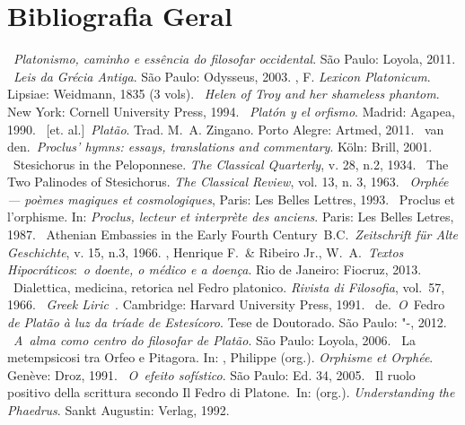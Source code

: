  

 

\section{Bibliografia Geral}


\begin{bibliohedra}
~\emph{Platonismo, caminho e essência do filosofar
  occidental}. São Paulo: Loyola, 2011.
~\emph{Leis da Grécia Antiga}. São Paulo: Odysseus,
  2003.
, F. \emph{Lexicon Platonicum}. Lipsiae: Weidmann,
  1835 (3 vols).
~\emph{Helen of Troy and her shameless phantom}. New York:
  Cornell University Press, 1994.
~\emph{Platón y el orfismo}. Madrid: Agapea, 1990.
~[et. al.]~\emph{Platão}. Trad. M.~A. Zingano. Porto
  Alegre: Artmed, 2011.
~van den.~\emph{Proclus' hymns: essays, translations and
  commentary}. Köln: Brill, 2001.
~Stesichorus in the Peloponnese. \emph{The Classical
  Quarterly}, v. 28, n.2, 1934.
~The Two Palinodes of Stesichorus. \emph{The Classical
  Review}, vol. 13, n. 3, 1963.
~\emph{Orphée --- poèmes magiques et cosmologiques}, Paris:
  Les Belles Lettres, 1993.
~Proclus et l'orphisme. In: \emph{Proclus, lecteur et
  interprète des anciens}. Paris: Les Belles Letres, 1987.
~Athenian Embassies in the Early Fourth
  Century~B.C.~\emph{Zeitschrift für Alte Geschichte}, v. 15, n.3, 1966.
, Henrique F.~\& Ribeiro Jr., W.~A.~\emph{Textos
  Hipocráticos}:~\emph{o doente, o médico e a doença}. Rio de Janeiro:
  Fiocruz, 2013.
~Dialettica, medicina, retorica nel Fedro platonico.
  \emph{Rivista di Filosofia}, vol.~57, 1966.
~\emph{Greek Liric~}. Cambridge: Harvard University Press,
  1991.
~de.~\emph{O}~Fedro \emph{de Platão à luz da tríade de
  Estesícoro}. Tese de Doutorado. São Paulo: "-, 2012.
~\emph{A~alma como centro do filosofar de Platão}. São
  Paulo: Loyola, 2006.
~La metempsicosi tra Orfeo e Pitagora. In: , Philippe (org.).
  \emph{Orphisme et Orphée}. Genève: Droz, 1991.
~\emph{O~efeito sofístico}. São Paulo: Ed. 34, 2005.
~Il ruolo positivo della scrittura secondo Il Fedro di
  Platone.~In:  (org.). \emph{Understanding the Phaedrus}. Sankt
  Augustin: Verlag, 1992.

\end{bibliohedra}
